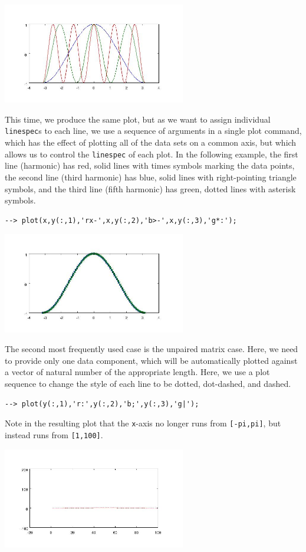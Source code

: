 \centerline{\includegraphics[width=8cm]{plot2}}


This time, we produce the same plot, but as we want to assign individual
\verb|linespec|s to each line, we use a sequence of arguments in a single plot
command, which has the effect of plotting all of the data sets on a common 
axis, but which allows us to control the \verb|linespec| of each plot. In 
the following example, the first line (harmonic) has red, solid lines with 
times symbols
marking the data points, the second line (third harmonic) has blue, solid lines
with right-pointing triangle symbols, and the third line (fifth harmonic) has
green, dotted lines with asterisk symbols.
\begin{verbatim}
--> plot(x,y(:,1),'rx-',x,y(:,2),'b>-',x,y(:,3),'g*:');
\end{verbatim}


\centerline{\includegraphics[width=8cm]{plot3}}


The second most frequently used case is the unpaired matrix case.  Here, we need
to provide only one data component, which will be automatically plotted against
a vector of natural number of the appropriate length.  Here, we use a plot sequence
to change the style of each line to be dotted, dot-dashed, and dashed.
\begin{verbatim}
--> plot(y(:,1),'r:',y(:,2),'b;',y(:,3),'g|');
\end{verbatim}
Note in the resulting plot that the \verb|x|-axis no longer runs from \verb|[-pi,pi]|, but 
instead runs from \verb|[1,100]|.


\centerline{\includegraphics[width=8cm]{plot4}}


